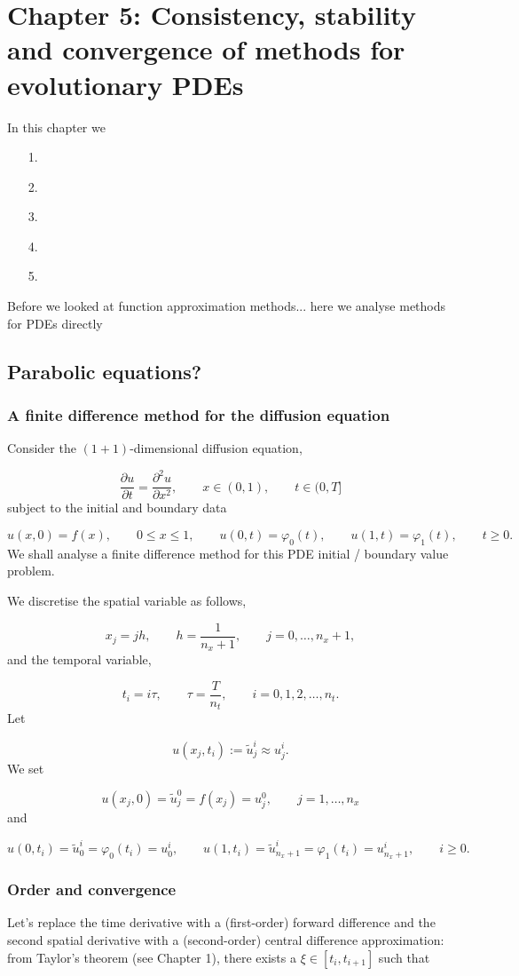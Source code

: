 \documentclass[12pt,a4paper]{article}
\begin{document}
\section{Chapter 5: Consistency, stability and convergence of methods for evolutionary PDEs}
In this chapter we 

\begin{itemize}
\item[1. ] 
\item[2. ] 
\item[3. ] 
\item[4. ] 
\item[5. ] \end{itemize}
Before we looked at function approximation methods... here we analyse methods for PDEs directly

\subsection{Parabolic equations?}
\subsubsection{A finite difference method for the diffusion equation}
Consider the $(1+1)$-dimensional diffusion equation,

\[
\frac{\partial u}{\partial t}=\frac{\partial^2 u}{\partial x^2}, \qquad x \in (0, 1),\qquad t \in (0, T]
\]
subject to the initial and boundary data

\[
u(x,0) = f(x), \qquad 0 \leq x \leq 1, \qquad u(0,t) = \varphi_0(t), \qquad u(1,t) = \varphi_1(t), \qquad t \geq 0.
\]
We shall analyse a finite difference method for this PDE initial / boundary value problem.

We discretise the spatial variable as follows,

\[
x_j = j h, \qquad h = \frac{1}{n_x + 1}, \qquad j = 0, \ldots, n_x + 1,
\]
and the temporal variable,

\[
t_i = i\tau, \qquad \tau = \frac{T}{n_t}, \qquad i = 0, 1, 2, \ldots, n_t.
\]
Let 

\[
u(x_j, t_i) := \tilde{u}^i_j \approx u^{i}_j.
\]
We set

\[
u(x_j, 0) = \tilde{u}^0_j =  f(x_j) =  u^{0}_j, \qquad j = 1, \ldots, n_x
\]
and

\[
u(0,t_i)  = \tilde{u}^i_0 = \varphi_0(t_i) =  u^i_0, \qquad u(1,t_i) =  \tilde{u}^i_{n_x + 1} = \varphi_1(t_i) =  u^i_{n_x +1}, \qquad i \geq 0.
\]
\subsubsection{Order and convergence}
Let's replace the time derivative with a (first-order) forward difference and the second spatial derivative with a (second-order) central difference approximation: from Taylor's theorem (see Chapter 1), there exists a $\xi \in [t_i, t_{i+1}]$ such that
\end{document}
